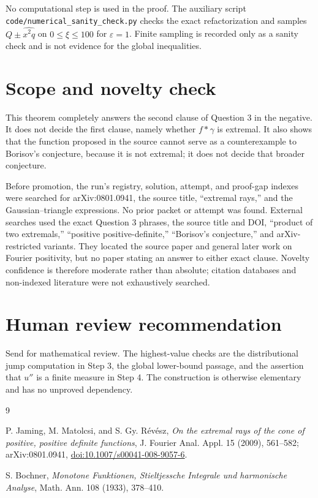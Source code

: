 \documentclass[11pt]{article}
\begin{document}
No computational step is used in the proof.  The auxiliary script
\texttt{code/numerical\_sanity\_check.py} checks the exact refactorization
and samples $Q\pm\widehat{x^2q}$ on $0\leq\xi\leq100$ for
$\varepsilon=1$.  Finite sampling is recorded only as a sanity check and is
not evidence for the global inequalities.

\section*{Scope and novelty check}

This theorem completely answers the second clause of Question 3 in the
negative.  It does not decide the first clause, namely whether $f*\gamma$ is
extremal.  It also shows that the function proposed in the source cannot
serve as a counterexample to Borisov's conjecture, because it is not
extremal; it does not decide that broader conjecture.

Before promotion, the run's registry, solution, attempt, and proof-gap
indexes were searched for arXiv:0801.0941, the source title, ``extremal
rays,'' and the Gaussian--triangle expressions.  No prior packet or attempt
was found.  External searches used the exact Question 3 phrases, the source
title and DOI, ``product of two extremals,'' ``positive positive-definite,''
``Borisov's conjecture,'' and arXiv-restricted variants.  They located the
source paper and general later work on Fourier positivity, but no paper
stating an answer to either exact clause.  Novelty confidence is therefore
moderate rather than absolute; citation databases and non-indexed literature
were not exhaustively searched.

\section*{Human review recommendation}

Send for mathematical review.  The highest-value checks are the
distributional jump computation in Step 3, the global lower-bound passage,
and the assertion that $u''$ is a finite measure in Step 4.  The construction
is otherwise elementary and has no unproved dependency.

\begin{thebibliography}{9}

P. Jaming, M. Matolcsi, and S. Gy. R\'ev\'esz,
\emph{On the extremal rays of the cone of positive, positive definite
functions}, J. Fourier Anal. Appl. 15 (2009), 561--582;
arXiv:0801.0941,
\href{https://doi.org/10.1007/s00041-008-9057-6}{doi:10.1007/s00041-008-9057-6}.

S. Bochner,
\emph{Monotone Funktionen, Stieltjessche Integrale und harmonische Analyse},
Math. Ann. 108 (1933), 378--410.

\end{thebibliography}
\end{document}
